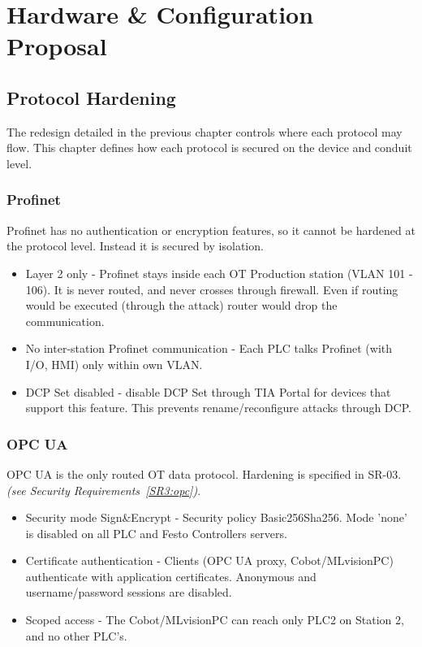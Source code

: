 \documentclass{report}
\begin{document}
\chapter{Hardware \& Configuration Proposal}\label{chap:7-hardware}

\section{Protocol Hardening}
The redesign detailed in the previous chapter controls where each protocol may flow. This chapter defines how each protocol is secured on the device and conduit level.

\subsection{Profinet}
Profinet has no authentication or encryption features, so it cannot be hardened at the protocol level. Instead it is secured by isolation.

\begin{itemize}
    \item Layer 2 only - Profinet stays inside each OT Production station (VLAN 101 - 106). It is never routed, and never crosses through firewall. Even if routing would be executed (through the attack) router would drop the communication.
    \item No inter-station Profinet communication - Each PLC talks Profinet (with I/O, HMI) only within own VLAN.
    \item DCP Set disabled - disable DCP Set through TIA Portal for devices that support this feature. This prevents rename/reconfigure attacks through DCP.
\end{itemize}

\subsection{OPC UA}\label{sub:7-hardware-OPC}
OPC UA is the only routed OT data protocol. Hardening is specified in SR-03. \textit{(see Security Requirements~\ref{SR3:opc})}.

\begin{itemize}
    \item Security mode Sign\&Encrypt - Security policy Basic256Sha256. Mode 'none' is disabled on all PLC and Festo Controllers servers.
    \item Certificate authentication - Clients (OPC UA proxy, Cobot/MLvisionPC) authenticate with application certificates. Anonymous and username/password sessions are disabled.
    \item Scoped access - The Cobot/MLvisionPC can reach only PLC2 on Station 2, and no other PLC's.
\end{itemize}
\end{document}
